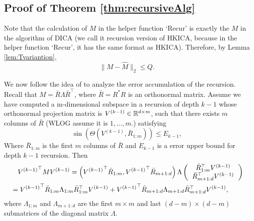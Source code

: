 \subsection{Proof of Theorem \ref{thm:recursiveAlg}}
Note that the calculation of $M$ in the helper function `Recur' is exactly the $M$ in the algorithm of DICA (we call it recursion version of HKICA, because in the helper function `Recur', it has the same format as HKICA).
Therefore, by Lemma \ref{lem:Tvariantion},
\[
\|M-\hat{M}\|_2 \le Q.
\]

We now follow the idea of \citet{vempala2014max} to analyze the error accumulation of the recursion.
Recall that $M = \bar{R}\Lambda\bar{R}^{\top}$, where $\bar{R} = R^*R$ is an orthonormal matrix.
Assume we have computed a m-dimensional subspace in a recursion of depth $k-1$ whose orthonormal projection matrix is $V^{(k-1)} \in \mathbb{R}^{d\times m}$, such that there exists $m$ columns of $\bar{R}$ (WLOG assume it is $1,\ldots,m$.) satisfying
\[
\sin\left(\Theta\left(V^{(k-1)}, \bar{R}_{1:m}\right)\right) \le E_{k-1},
\] 
Where $\bar{R}_{1:m}$ is the first $m$ columns of $\bar{R}$ and $E_{k-1}$ is a error upper bound for depth $k-1$ recursion.
Then
\begin{align*}
& \quad {V^{(k-1)}}^\top MV^{(k-1)} = \left( {V^{(k-1)}}^\top\bar{R}_{1:m}, {V^{(k-1)}}^\top\bar{R}_{m+1:d}\right)\Lambda
\left(
\begin{tabular}{c}
$\bar{R}_{1:m}^{\top} V^{(k-1)}$ \\
$\bar{R}_{m+1:d}^{\top} V^{(k-1)}$
\end{tabular}
\right) \\
& = {V^{(k-1)}}^\top\bar{R}_{1:m}\Lambda_{1:m} \bar{R}_{1:m}^{\top} V^{(k-1)} + {V^{(k-1)}}^\top\bar{R}_{m+1:d}\Lambda_{m+1:d}\bar{R}_{m+1:d}^{\top} V^{(k-1)},
\end{align*}
where $\Lambda_{1:m}$ and $\Lambda_{m+1:d}$ are the first $m\times m$  and last $(d-m)\times (d-m)$ submatrices of the diagonal matrix $\Lambda$.

